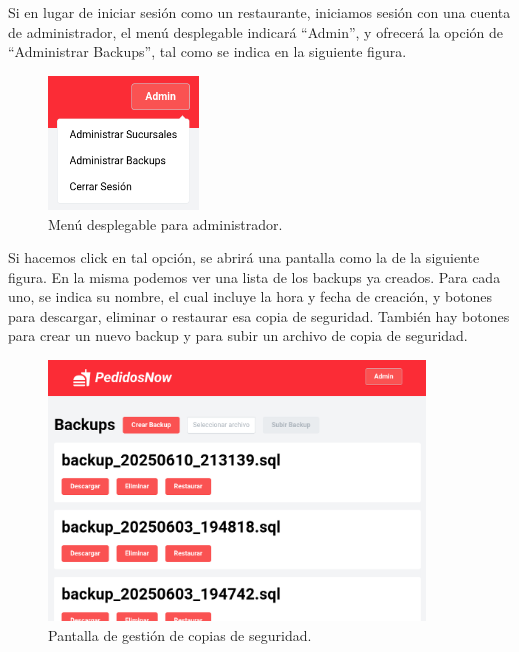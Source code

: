 Si en lugar de iniciar sesión como un restaurante, iniciamos sesión con una cuenta de administrador, el menú desplegable indicará ``Admin'', y ofrecerá la opción de ``Administrar Backups'', tal como se indica en la siguiente figura.

\begin{figure}[H]
    \centering
    \includegraphics[width=4cm]{./img/admin-dropdown.png}
    \caption{Menú desplegable para administrador.}
\end{figure}

Si hacemos click en tal opción, se abrirá una pantalla como la de la siguiente figura. En la misma podemos ver una lista de los backups ya creados. Para cada uno, se indica su nombre, el cual incluye la hora y fecha de creación, y botones para descargar, eliminar o restaurar esa copia de seguridad. También hay botones para crear un nuevo backup y para subir un archivo de copia de seguridad.

\begin{figure}[H]
    \centering
    \includegraphics[width=10cm]{./img/admin-backups.png}
    \caption{Pantalla de gestión de copias de seguridad.}
\end{figure}
